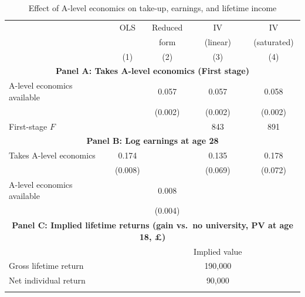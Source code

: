 \begin{table}[htbp]
\centering
\caption{Effect of A-level economics on take-up, earnings, and lifetime income}
\label{tab:main}
\begin{tabular}{l cccc}
\toprule
                                      & OLS        & Reduced    & IV         & IV           \\
                                      &            & form       & (linear)   & (saturated)  \\
                                      & (1)        & (2)        & (3)        & (4)          \\
\midrule
\multicolumn{5}{c}{\textbf{Panel A: Takes A-level economics (First stage) }} \\
\midrule
A-level economics available           &            & 0.057\sym{***}& 0.057\sym{***}& 0.058\sym{***}  \\
                                      &            & (0.002)       & (0.002)       & (0.002)         \\
\addlinespace
First-stage $F$                       &            &            & 843         & 891           \\
\midrule
\multicolumn{5}{c}{\textbf{Panel B: Log earnings at age 28}} \\
\midrule
Takes A-level economics               & 0.174\sym{***}&            & 0.135\sym{*}& 0.178\sym{**}  \\
                                      & (0.008)       &            & (0.069)       & (0.072)         \\
\addlinespace
A-level economics available           &            & 0.008\sym{*}&            &              \\
                                      &            & (0.004)       &            &              \\
\midrule
\multicolumn{5}{c}{\textbf{Panel C: Implied lifetime returns (gain vs.\ no university, PV at age 18, \pounds)}} \\
\midrule
                                      &            &            & Implied value &            \\
\midrule
Gross lifetime return                 &            &            & 190,000 &          \\
\addlinespace
Net individual return                 &            &            & 90,000 &           \\
\addlinespace

\end{tabular}
\end{table}
